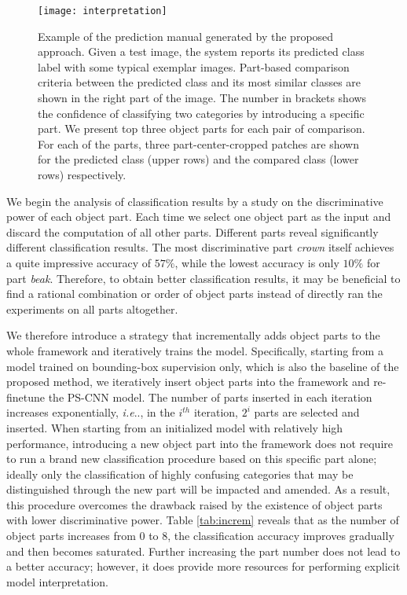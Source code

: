 \documentclass[10pt,twocolumn,letterpaper]{article}
\makeatletter
\DeclareRobustCommand\onedot{\futurelet\@let@token\@onedot}
\def\@onedot{\ifx\@let@token.\else.\null\fi\xspace}
\def\ie{\emph{i.e}\onedot} \def\Ie{\emph{I.e}\onedot}
\makeatother
\begin{document}
\begin{figure*}[t]
\begin{center}
\texttt{[image: interpretation]}
\end{center}
   \caption{Example of the prediction manual generated by the proposed approach. Given a test image, the system reports its predicted class label with some typical exemplar images. Part-based comparison criteria between the predicted class and its most similar classes are shown in the right part of the image. The number in brackets shows the confidence of classifying two categories by introducing a specific part. We present top three object parts for each pair of comparison. For each of the parts, three part-center-cropped patches are shown for the predicted class (upper rows) and the compared class (lower rows) respectively.}
\label{fig:interpret}
\end{figure*}











We begin the analysis of classification results by a study on the discriminative power of each object part. Each time we select one object part as the input and discard the computation of all other parts. Different parts reveal significantly different classification results. The most discriminative part \emph{crown} itself achieves a quite impressive accuracy of $57\%$, while the lowest accuracy is only $10\%$ for part \emph{beak}. Therefore, to obtain better classification results, it may be beneficial to find a rational combination or order of object parts instead of directly ran the experiments on all parts altogether.







We therefore introduce a strategy that incrementally adds object parts to the whole framework and iteratively trains the model. Specifically, starting from a model trained on bounding-box supervision only, which is also the baseline of the proposed method, we iteratively insert object parts into the framework and re-finetune the PS-CNN model. The number of parts inserted in each iteration increases exponentially, \ie, in the $i^{th}$ iteration, $2^{i}$ parts are selected and inserted. When starting from an initialized model with relatively high performance, introducing a new object part into the framework does not require to run a brand new classification procedure based on this specific part alone; ideally only the classification of highly confusing categories that may be distinguished through the new part will be impacted and amended. As a result, this procedure overcomes the drawback raised by the existence of object parts with lower discriminative power. Table \ref{tab:increm} reveals that as the number of object parts increases from $0$ to $8$, the classification accuracy improves gradually and then becomes saturated. Further increasing the part number does not lead to a better accuracy; however, it does provide more resources for performing explicit model interpretation.
\end{document}

